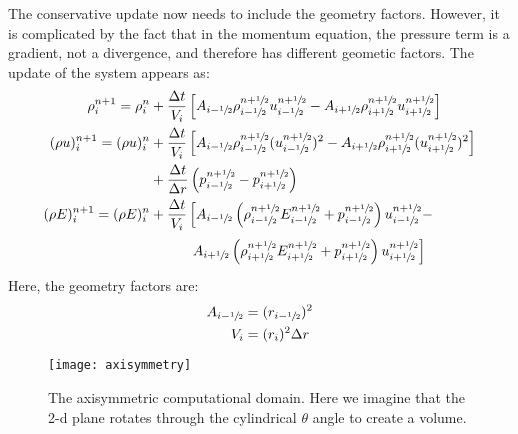 The conservative update now needs to include the geometry factors.  However,
it is complicated by the fact that in the momentum equation, the pressure
term is a gradient, not a divergence, and therefore has different
geometic factors.  The update of the system appears as:
\begin{align}
\rho^{n+1}_i = \rho^n_i &+ \frac{\Delta t}{V_i}
   \left [A_{i-\myhalf} \rho_{i-\myhalf}^{n+\myhalf} u_{i-\myhalf}^{n+\myhalf} -
          A_{i+\myhalf} \rho_{i+\myhalf}^{n+\myhalf} u_{i+\myhalf}^{n+\myhalf} \right ] \\
(\rho u)^{n+1}_i = (\rho u)^n_i &+ \frac{\Delta t}{V_i}
   \left [ A_{i-\myhalf} \rho_{i-\myhalf}^{n+\myhalf} (u_{i-\myhalf}^{n+\myhalf})^2  -
           A_{i+\myhalf} \rho_{i+\myhalf}^{n+\myhalf} (u_{i+\myhalf}^{n+\myhalf})^2  \right ]\nonumber \\
        & + \frac{\Delta t}{\Delta r} \left ( p_{i-\myhalf}^{n+\myhalf} -
                                              p_{i+\myhalf}^{n+\myhalf} \right ) \\
(\rho E)^{n+1}_i = (\rho E)^n_i &+ \frac{\Delta t}{V_i}
   \left [ A_{i-\myhalf} \left (\rho_{i-\myhalf}^{n+\myhalf} E_{i-\myhalf}^{n+\myhalf}  + p_{i-\myhalf}^{n+\myhalf} \right ) u_{i-\myhalf}^{n+\myhalf} - \right . \nonumber \\
   &\phantom{+ \frac{\Delta t}{V_i} \left[ \right.}   \left .   A_{i+\myhalf} \left (\rho_{i+\myhalf}^{n+\myhalf} E_{i+\myhalf}^{n+\myhalf}  + p_{i+\myhalf}^{n+\myhalf} \right ) u_{i+\myhalf}^{n+\myhalf} \right ]
\end{align}
Here, the geometry factors are:
\begin{align}
A_{i-{\sfrac{1}{2}}} &= (r_{i-{\sfrac{1}{2}}})^2\\
V_i &= (r_i)^2 \Delta r
\end{align}

\begin{figure}
\centering
\texttt{[image: axisymmetry]}
\caption[The axisymmetric computational domain]
{\label{fig:axisymmetri} The axisymmetric computational domain.  Here we
  imagine that the 2-d plane rotates through the cylindrical $\theta$ angle to
  create a volume.}
\end{figure}

